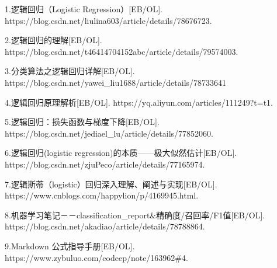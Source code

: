 \documentclass[11pt,a3paper]{article}
\begin{document}
    {1.逻辑回归（Logistic Regression）{[}EB/OL{]}.
https://blog.csdn.net/liulina603/article/details/78676723.\par
2.逻辑回归的理解{[}EB/OL{]}.
https://blog.csdn.net/t46414704152abc/article/details/79574003.\par
3.分类算法之逻辑回归详解{[}EB/OL{]}.
https://blog.csdn.net/yawei\_liu1688/article/details/78733641\par
4.逻辑回归原理解析{[}EB/OL{]}.
https://yq.aliyun.com/articles/111249?t=t1.\par
5.逻辑回归：损失函数与梯度下降{[}EB/OL{]}.
https://blog.csdn.net/jediael\_lu/article/details/77852060.\par
6.逻辑回归(logistic regression)的本质------极大似然估计{[}EB/OL{]}.
https://blog.csdn.net/zjuPeco/article/details/77165974.\par
7.逻辑斯蒂（logistic）回归深入理解、阐述与实现{[}EB/OL{]}.
https://www.cnblogs.com/happylion/p/4169945.html.\par
8.机器学习笔记－－classification\_report\&精确度/召回率/F1值{[}EB/OL{]}.
https://blog.csdn.net/akadiao/article/details/78788864.\par 9.Markdown
公式指导手册{[}EB/OL{]}. https://www.zybuluo.com/codeep/note/163962\#4.}





    
\end{document}
